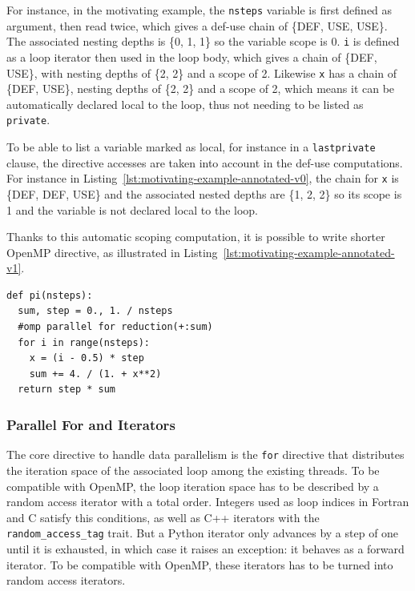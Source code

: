 \documentclass[conference]{IEEEtran}
\begin{document}
For instance, in the motivating example, the \texttt{nsteps} variable is first
defined as argument, then read twice, which gives a def-use chain of
\{DEF, USE, USE\}. The associated nesting depths is
\{0, 1, 1\} so the variable scope is 0. \texttt{i} is defined as a loop iterator
then used in the loop body, which gives a chain of \{DEF, USE\}, with nesting
depths of \{2, 2\} and a scope of 2. Likewise \texttt{x} has a chain of
\{DEF, USE\}, nesting depths of \{2, 2\} and a scope of 2, which means it can be
automatically declared local to the loop, thus not needing to be listed as
\texttt{private}.

To be able to list a variable marked as local, for instance in a
\texttt{lastprivate} clause, the directive accesses are taken into account in
the def-use computations. For instance in
Listing~\ref{lst:motivating-example-annotated-v0}, the chain for \texttt{x} is
\{DEF, DEF, USE\} and the associated nested depths are \{1, 2, 2\} so its scope
is 1 and the variable is not declared local to the loop.

Thanks to this automatic scoping computation, it is possible to write shorter
OpenMP directive, as illustrated in
Listing~\ref{lst:motivating-example-annotated-v1}.

\begin{lstlisting}[float, label={lst:motivating-example-annotated-v1},
  caption={Motivating example: computing $\pi$ in Python with OpenMP and
  automatic scoping.}]
def pi(nsteps):
  sum, step = 0., 1. / nsteps
  #omp parallel for reduction(+:sum)
  for i in range(nsteps):
    x = (i - 0.5) * step
    sum += 4. / (1. + x**2)
  return step * sum
\end{lstlisting}

\subsubsection{Parallel For and Iterators}

The core directive to handle data parallelism is the \texttt{for} directive that
distributes the iteration space of the associated loop among the existing
threads. To be compatible with OpenMP, the loop iteration space has to be
described by a random access iterator with a total order. Integers used as loop
indices in Fortran and C satisfy this conditions, as well as C++ iterators with
the \texttt{random\_access\_tag} trait. But a Python iterator only advances by a
step of one until it is exhausted, in which case it raises an exception: it
behaves as a forward iterator. To be compatible with OpenMP, these iterators
has to be turned into random access iterators.
\end{document}
